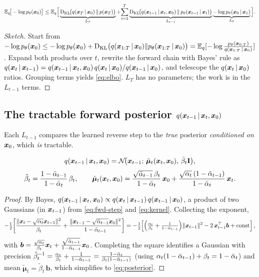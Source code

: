 \begin{proposition}
\begin{equation}
\mathbb{E}_q\!\big[-\log p_\theta(\bm{x}_0)\big]\le
\mathbb{E}_q\Big[\underbrace{\mathrm{D_{KL}}\!\big(q(\bm{x}_T\,\vert\,\bm{x}_0)\,\|\,p(\bm{x}_T)\big)}_{L_T}
+\!\sum_{t=2}^{T}\underbrace{\mathrm{D_{KL}}\!\big(q(\bm{x}_{t-1}\,\vert\,\bm{x}_t,\bm{x}_0)\,\|\,p_\theta(\bm{x}_{t-1}\,\vert\,\bm{x}_t)\big)}_{L_{t-1}}
\underbrace{-\log p_\theta(\bm{x}_0\,\vert\,\bm{x}_1)}_{L_0}\Big].
\label{eq:elbo}
\end{equation}
\end{proposition}
\begin{proof}[Sketch]
Start from $-\log p_\theta(\bm{x}_0)\le -\log p_\theta(\bm{x}_0)+\mathrm{D_{KL}}\big(q(\bm{x}_{1:T}\,\vert\,\bm{x}_0)\|p_\theta(\bm{x}_{1:T}\,\vert\,\bm{x}_0)\big)
=\mathbb{E}_q[-\log \frac{p_\theta(\bm{x}_{0:T})}{q(\bm{x}_{1:T}\,\vert\,\bm{x}_0)}]$.
Expand both products over $t$, rewrite the forward chain with Bayes' rule as
$q(\bm{x}_t\,\vert\,\bm{x}_{t-1})=q(\bm{x}_{t-1}\,\vert\,\bm{x}_t,\bm{x}_0)\,q(\bm{x}_t\,\vert\,\bm{x}_0)/q(\bm{x}_{t-1}\,\vert\,\bm{x}_0)$,
and telescope the $q(\bm{x}_t\,\vert\,\bm{x}_0)$ ratios. Grouping terms yields
\eqref{eq:elbo}. $L_T$ has no parameters; the work is in the $L_{t-1}$ terms.
\end{proof}

\subsection{The tractable forward posterior \texorpdfstring{$q(\bm{x}_{t-1}\,\vert\,\bm{x}_t,\bm{x}_0)$}{q(x\_\{t-1\} | x\_t, x\_0)}}
Each $L_{t-1}$ compares the learned reverse step to the \emph{true} posterior
\emph{conditioned on $\bm{x}_0$}, which \emph{is} tractable.

\begin{proposition}
\begin{equation}
q(\bm{x}_{t-1}\,\vert\,\bm{x}_t,\bm{x}_0)=\mathcal{N}\!\big(\bm{x}_{t-1};\,\tilde{\bm\mu}_t(\bm{x}_t,\bm{x}_0),\,\tilde\beta_t\mathbf{I}\big),
\end{equation}
\begin{equation}
\tilde\beta_t=\frac{1-\bar{\alpha}_{t-1}}{1-\bar{\alpha}_t}\,\beta_t,
\qquad
\tilde{\bm\mu}_t(\bm{x}_t,\bm{x}_0)=\frac{\sqrt{\bar{\alpha}_{t-1}}\,\beta_t}{1-\bar{\alpha}_t}\,\bm{x}_0
+\frac{\sqrt{\alpha_t}\,(1-\bar{\alpha}_{t-1})}{1-\bar{\alpha}_t}\,\bm{x}_t.
\label{eq:posterior}
\end{equation}
\end{proposition}
\begin{proof}
By Bayes,
$q(\bm{x}_{t-1}\,\vert\,\bm{x}_t,\bm{x}_0)\propto q(\bm{x}_t\,\vert\,\bm{x}_{t-1})\,q(\bm{x}_{t-1}\,\vert\,\bm{x}_0)$,
a product of two Gaussians (in $\bm{x}_{t-1}$) from \eqref{eq:fwd-step} and
\eqref{eq:kernel}. Collecting the exponent,
\[
-\tfrac12\!\left[\frac{\|\bm{x}_t-\sqrt{\alpha_t}\bm{x}_{t-1}\|^2}{\beta_t}
+\frac{\|\bm{x}_{t-1}-\sqrt{\bar{\alpha}_{t-1}}\bm{x}_0\|^2}{1-\bar{\alpha}_{t-1}}\right]
=-\tfrac12\!\left[\Big(\tfrac{\alpha_t}{\beta_t}+\tfrac{1}{1-\bar{\alpha}_{t-1}}\Big)\|\bm{x}_{t-1}\|^2
-2\,\bm{x}_{t-1}^\top\bm b+\text{const}\right],
\]
with $\bm b=\frac{\sqrt{\alpha_t}}{\beta_t}\bm{x}_t+\frac{\sqrt{\bar{\alpha}_{t-1}}}{1-\bar{\alpha}_{t-1}}\bm{x}_0$.
Completing the square identifies a Gaussian with precision
$\tilde\beta_t^{-1}=\frac{\alpha_t}{\beta_t}+\frac{1}{1-\bar{\alpha}_{t-1}}=\frac{1-\bar{\alpha}_t}{\beta_t(1-\bar{\alpha}_{t-1})}$
(using $\alpha_t(1-\bar{\alpha}_{t-1})+\beta_t=1-\bar{\alpha}_t$) and mean
$\tilde{\bm\mu}_t=\tilde\beta_t\,\bm b$, which simplifies to \eqref{eq:posterior}.
\end{proof}

